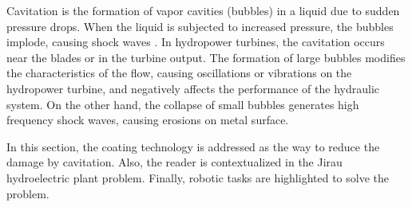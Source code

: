 Cavitation is the formation of vapor cavities (bubbles) in a liquid due to
sudden pressure drops. When the liquid is subjected to increased pressure,
the bubbles implode, causing shock waves \citep{brennen2013cavitation}. 
In hydropower turbines, the cavitation occurs near the blades or
in the turbine output.%
 The formation of large bubbles modifies the
characteristics of the flow, causing oscillations or vibrations on the
hydropower turbine, and negatively affects the performance of the hydraulic
system. On the other hand, the collapse of small bubbles generates high
frequency shock waves, causing erosions on metal surface.


In this section, the coating technology is addressed as the way to
reduce the damage by cavitation. Also, the reader is contextualized in
the Jirau hydroelectric plant problem. Finally,  robotic tasks are highlighted to
solve the problem.

